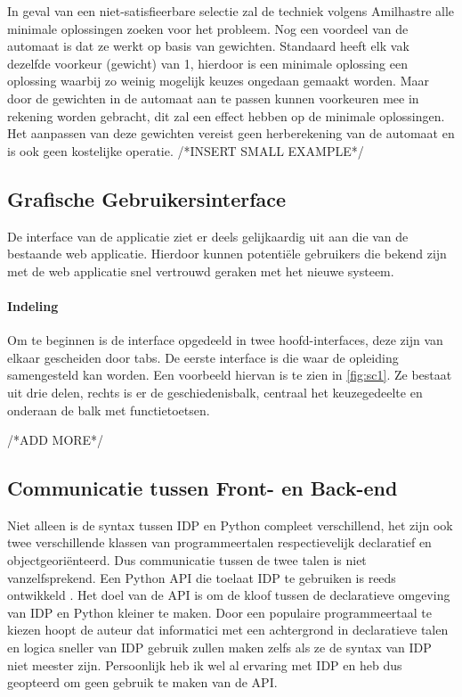In geval van een niet-satisfieerbare selectie zal de techniek volgens Amilhastre alle minimale oplossingen zoeken voor het probleem. Nog een voordeel van de automaat is dat ze werkt op basis van gewichten. Standaard heeft elk vak dezelfde voorkeur (gewicht) van 1, hierdoor is een minimale oplossing een oplossing waarbij zo weinig mogelijk keuzes ongedaan gemaakt worden. Maar door de gewichten in de automaat aan te passen kunnen voorkeuren mee in rekening worden gebracht, dit zal een effect hebben op de minimale oplossingen. Het aanpassen van deze gewichten vereist geen herberekening van de automaat en is ook geen kostelijke operatie. /*INSERT SMALL EXAMPLE*/


\subsection{Grafische Gebruikersinterface}
De interface van de applicatie ziet er deels gelijkaardig uit aan die van de bestaande web applicatie. Hierdoor kunnen potenti\"{e}le gebruikers die bekend zijn met de web applicatie snel vertrouwd geraken met het nieuwe systeem. 

\paragraph{Indeling}
Om te beginnen is de interface opgedeeld in twee hoofd-interfaces, deze zijn van elkaar gescheiden door tabs. De eerste interface is die waar de opleiding samengesteld kan worden. Een voorbeeld hiervan is te zien in \ref{fig:sc1}. Ze bestaat uit drie delen, rechts is er de geschiedenisbalk, centraal het keuzegedeelte en onderaan de balk met functietoetsen. 

/*ADD MORE*/

\subsection{Communicatie tussen Front- en Back-end}
Niet alleen is de syntax tussen IDP en Python compleet verschillend, het zijn ook twee verschillende klassen van programmeertalen respectievelijk declaratief en objectgeori\"{e}nteerd. Dus communicatie tussen de twee talen is niet vanzelfsprekend. Een Python API die toelaat IDP te gebruiken is reeds ontwikkeld \citep{vennekens2015lowering}. Het doel van de API is om de kloof tussen de declaratieve omgeving van IDP en Python kleiner te maken. Door een populaire programmeertaal te kiezen hoopt de auteur dat informatici met een achtergrond in declaratieve talen en logica sneller van IDP gebruik zullen maken zelfs als ze de syntax van IDP niet meester zijn. Persoonlijk heb ik wel al ervaring met IDP en heb dus geopteerd om geen gebruik te maken van de API. 

